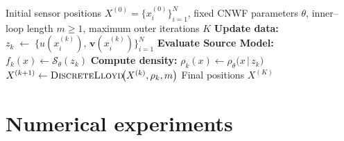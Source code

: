 \documentclass[onefignum,onetabnum]{siamart171218} %
\begin{document}
\begin{algorithm}[H]
\caption{Adaptive sensor placement with learned importance density}
\label{alg:outer}
\begin{algorithmic}[1]
\Require
    Initial sensor positions $X^{(0)}=\{x_i^{(0)}\}_{i=1}^{N}$,\;
    fixed CNWF parameters $\theta$,\;
    inner–loop length $m\ge1$, maximum outer iterations $K$
\vspace{.2em}
    \State \textbf{Update data:}
           $z_k \;\gets\;
               \bigl\{u(x_i^{(k)}),\,\mathbf{v}(x_i^{(k)})\bigr\}_{i=1}^{N}$ %
    \State \textbf{Evaluate Source Model:}
           $f_k(x)\gets
            \mathcal{S}_\theta(z_k)$
    \State \textbf{Compute density:}
           $\rho_k(x)\gets
            \rho_\theta\!\bigl(x\,\big|\,z_k\bigr)$
           \Comment{\eqref{eq:density}}
    \State $X^{(k+1)} \gets
           \textsc{DiscreteLloyd}\!\bigl(X^{(k)},\rho_k,m\bigr)$
\EndFor
\Ensure Final positions $X^{(K)}$
\end{algorithmic}
\end{algorithm}



\section{Numerical experiments}
\label{sec:exp}
\end{document}
